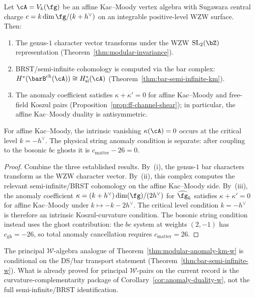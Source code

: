 \begin{theorem}
\label{thm:modular-anomaly-km-w}
Let $\cA=V_k(\fg)$ be an affine Kac--Moody vertex algebra with
Sugawara central charge $c=k\dim\fg/(k+h^\vee)$ on an integrable
positive-level WZW surface. Then:
\begin{enumerate}[label=\textup{(\roman*)}]
\item The genus-$1$ character vector transforms under the WZW
 $\mathrm{SL}_2(\bZ)$ representation
 \textup{(}Theorem~\textup{\ref{thm:modular-invariance})}.
\item BRST\slash semi-infinite
 cohomology is computed via the bar complex:
 $H^*(\barB^{\mathrm{ch}}(\cA)) \cong
 H^*_{\mathrm{si}}(\cA)$
 \textup{(}Theorem~\textup{\ref{thm:bar-semi-infinite-km})}.
\item The anomaly coefficient satisfies $\kappa + \kappa' = 0$ for affine Kac--Moody and free-field Koszul pairs
 \textup{(}Proposition~\textup{\ref{prop:ff-channel-shear})};
 in particular, the affine Kac--Moody duality is antisymmetric.
\end{enumerate}
For affine Kac--Moody, the intrinsic vanishing
$\kappa(\cA) = 0$ occurs at the critical level $k = -h^\vee$.
The physical string anomaly condition is separate: after coupling to
the bosonic $bc$ ghosts it is $c_{\mathrm{matter}}-26=0$.
\end{theorem}

\begin{proof}
Combine the three established results.
By~(i), the genus-$1$ bar characters transform as the WZW
character vector. By~(ii), this complex computes the relevant
semi-infinite\slash BRST cohomology on the affine Kac--Moody side.
By~(iii), the anomaly
coefficient $\kappa = (k+h^\vee)\dim(\fg)/(2h^\vee)$ for
$\widehat{\fg}_k$ satisfies $\kappa + \kappa' = 0$ for affine Kac--Moody
under $k \mapsto -k - 2h^\vee$. The critical level condition
$k=-h^\vee$ is therefore an intrinsic Koszul-curvature condition.
The bosonic string condition instead uses the ghost contribution:
the $bc$ system at weights $(2,-1)$ has $c_{\mathrm{gh}}=-26$, so
total anomaly cancellation requires $c_{\mathrm{matter}}=26$.
\end{proof}

\begin{remark}
The principal $\mathcal{W}$-algebra analogue of
Theorem~\ref{thm:modular-anomaly-km-w} is conditional on the
DS/bar transport statement
\textup{(}Theorem~\textup{\ref{thm:bar-semi-infinite-w}}\textup{)}.
What is already proved for principal $\mathcal{W}$-pairs on the
current record is the curvature-complementarity package of
Corollary~\ref{cor:anomaly-duality-w}, not the full
semi-infinite/BRST identification.
\end{remark}


